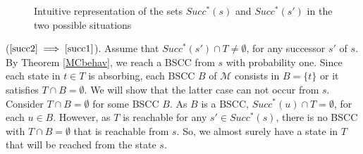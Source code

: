 \begin{proof2}
\begin{figure}[H]
\begin{minipage}{0.5\linewidth}
  \end{minipage}
  \captionsetup{justification=centering}
  \caption{Intuitive representation of the sets $Succ^*(s)$ and $Succ^*(s')$ in the two possible situations}
  \label{2sit}
\end{figure}
\noindent($\ref{succ2} \implies \ref{succ1}$). Assume that $Succ^*(s') \cap T \neq \emptyset$, for any successor $s'$ of $s$. By Theorem \ref{MCbehav}, we reach a BSCC from $s$ with probability one. Since each state in $t \in T$ is absorbing, each BSCC $B$ of $\mathcal{M}$ consists in $B = \{t\}$ or it satisfies $T \cap B = \emptyset$. We will show that the latter case can not occur from $s$.
Consider $T \cap B = \emptyset$ for some BSCC $B$.
As $B$ is a BSCC, $Succ^*(u)\cap T = \emptyset$, for each $u \in B$.
However, as $T$ is reachable for any $s' \in Succ^*(s)$, there is no BSCC with $T \cap B = \emptyset$ that is reachable from $s$. So, we almost surely have a state in $T$ that will be reached from the state $s$.
\end{proof2}
\\

